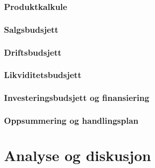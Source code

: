 \subsection{Produktkalkule}

\subsection{Salgsbudsjett}

\subsection{Driftsbudsjett}

\subsection{Likviditetsbudsjett}

\subsection{Investeringsbudsjett og finansiering}

\subsection{Oppsummering og handlingsplan}

\chapter{Analyse og diskusjon}



